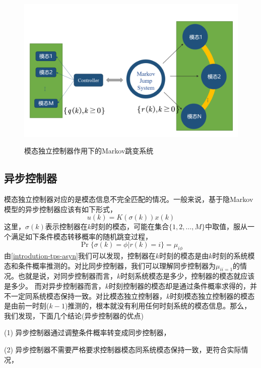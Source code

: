 	\begin{figure}[!htb] 
		\centering\includegraphics[scale=0.25]{./figures/introduction/idpsys.png}\\ 
		\caption{模态独立控制器作用下的Markov跳变系统}
		\label{intro_fig_idpsys}
	\end{figure}
	
	\subsection{异步控制器}
	模态独立控制器对应的是模态信息不完全匹配的情况。一般来说，基于隐Markov模型的异步控制器应该有如下形式，
	\begin{equation}
	u(k)=K(\sigma(k))x(k)
	\end{equation}
	这里，$\sigma(k)$表示控制器在$k$时刻的模态，可能在集合$\{1,2,\dots,M\}$中取值，服从一个满足如下条件模态转移概率的随机跳变过程，
	\begin{equation}\label{introdution-tps-asyn}
	\Pr\{\sigma(k)=\phi|r(k)=i \}=\mu_{i\phi}
	\end{equation}
	由\eqref{introdution-tps-asyn}我们可以发现，控制器在$k$时刻的模态是由$k$时刻的系统模态和条件概率推测的。对比同步控制器，我们可以理解同步控制器为$\mu_{ii=1}$的情况。也就是说，对同步控制器而言，$k$时刻系统模态是多少，控制器的模态就应该是多少。 而对异步控制器而言，$k$时刻控制器的模态却是通过条件概率求得的，并不一定同系统模态保持一致。对比模态独立控制器，$k$时刻模态独立控制器的模态是由前一时刻($k-1$)推测的，根本就没有利用任何时刻系统的模态信息。那么，我们发现，下面几个结论(异步控制器的优点)
		
		(1) 异步控制器通过调整条件概率转变成同步控制器，
		
		(2) 异步控制器不需要严格要求控制器模态同系统模态保持一致，更符合实际情况，
		
